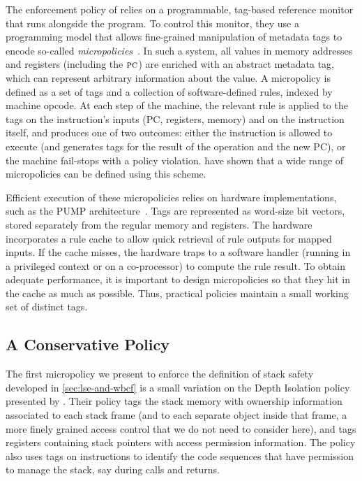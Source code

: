 \documentclass[acmsmall,review,anonymous]{acmart}\settopmatter{printfolios=true,printccs=false,printacmref=false}
\begin{document}
{%
%
The enforcement policy of \citeauthor{DBLP:conf/sp/RoesslerD18} relies
on a programmable, tag-based reference monitor that runs alongside the
program.  To control this monitor, they use a programming model that
allows fine-grained manipulation of metadata tags to encode so-called
\emph{micropolicies}~\citep{pump_oakland2015}.
In such a system, all values in
memory addresses and registers (including the $\textsc{pc}$)
are enriched with an abstract metadata tag, which can represent
arbitrary information about the value. A micropolicy is defined as a set of tags and a
collection of software-defined rules, indexed by machine opcode.
At each step of the machine, the relevant rule is applied to the tags on
the instruction's inputs (PC, registers, memory) and on the instruction itself, and produces
one of two outcomes: either the instruction is allowed to execute (and generates
tags for the result of the operation and the new PC), or the machine
fail-stops with a policy violation.
\citeauthor{pump_oakland2015} have shown that a wide range of micropolicies can
be defined using this scheme.

Efficient execution of these micropolicies relies on hardware implementations,
such as the PUMP architecture~\citep{pump:asplos2015}.  Tags are represented
as word-size bit vectors, stored separately from the regular memory and registers.
The hardware incorporates a rule cache
to allow quick retrieval of rule outputs for mapped inputs. If the cache misses,
the hardware traps to a software handler (running in a privileged context or
on a co-processor) to compute the rule result. To obtain adequate performance,
it is important to design micropolicies so that they hit in the cache as
much as possible. Thus, practical policies maintain a small working set of
distinct tags.

\subsection{A Conservative Policy}
\label{sec:conservative}
%
The first micropolicy we present to enforce the definition of stack
safety developed in \cref{sec:lse-and-wbcf} is a small variation
on the Depth Isolation policy presented by
\citet{DBLP:conf/sp/RoesslerD18}. Their policy tags the stack memory
with ownership information associated to each stack frame (and to each
separate object inside that frame, a more finely grained access
control that we do not need to consider here), and tags registers containing
stack pointers with access permission information. The policy also
uses tags on instructions to identify the code
sequences that have permission to manage the stack, say during calls and returns.

}
\end{document}
